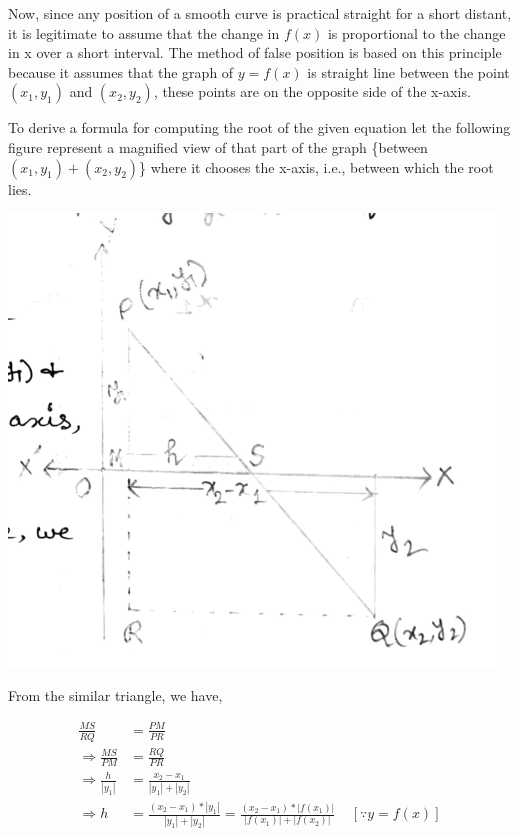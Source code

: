 \documentclass[11pt, a4paper, oneside]{book}
\begin{document}
            Now, since any position of a smooth curve is practical straight for a short distant,
            it is legitimate to assume that the change in $f(x)$ is proportional to the change in
            x over a short interval. The method of false position is based on this principle because
            it assumes that the graph of $y=f(x)$ is straight line between the point $(x_1,y_1)$ and
            $(x_2,y_2)$, these points are on the opposite side of the x-axis.

            To derive a formula for computing the root of the given equation let the following
            figure represent a magnified view of that part of the graph \{between $(x_1,y_1)+(x_2,y_2)$\}
            where it chooses the x-axis, i.e., between which the root lies.

            \includegraphics{mofdiagram}

            From the similar triangle, we have,

            \begin{align*}
                            \frac{MS}{RQ} &= \frac{PM}{PR}\\
              \Rightarrow   \frac{MS}{PM} &= \frac{RQ}{PR}\\
              \Rightarrow \frac{h}{|y_1|} &= \frac{x_2-x_1}{|y_1|+|y_2|}\\
              \Rightarrow               h &= \frac{(x_2-x_1)*|y_1|}{|y_1|+|y_2|}
                                           = \frac{(x_2-x_1)*|f(x_1)|}{|f(x_1)|+|f(x_2)|}
                                             \ \ \ \ \ [\because y=f(x)]
            \end{align*}
\end{document}
